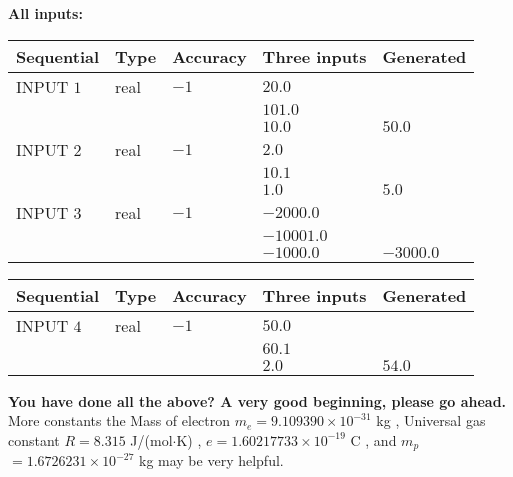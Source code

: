 \documentclass[12pt]{article}
\begin{document}
   
   
   
\noindent\vspace{0.1in}\hspace{-0.08in} {\textbf{\Large{All inputs: }}}
   
   
  
  
\noindent\begin{tabular}{|l|l|l|l|l|}
\hline
 Sequential & Type & Accuracy & Three inputs & Generated \\ 
\hline
 
 
  INPUT $           1$ & real & $          -1 $ & $
 20.0
  $ & \\
  & & &  $
 101.0
  $ & \\
  & & &  $
 10.0
 $ & $ 50.0 $ 
 \\  \hline  
 
 
  INPUT $           2$ & real & $          -1 $ & $
 2.0
  $ & \\
  & & &  $
 10.1
  $ & \\
  & & &  $
 1.0
 $ & $ 5.0 $ 
 \\  \hline  
 
 
  INPUT $           3$ & real & $          -1 $ & $
 -2000.0
  $ & \\
  & & &  $
 -10001.0
  $ & \\
  & & &  $
 -1000.0
 $ & $ -3000.0 $ 
 \\  \hline  
 \end{tabular}
   
   
  
  
\noindent\begin{tabular}{|l|l|l|l|l|}
\hline
 Sequential & Type & Accuracy & Three inputs & Generated \\ 
\hline
 
 
  INPUT $           4$ & real & $          -1 $ & $
 50.0
  $ & \\
  & & &  $
 60.1
  $ & \\
  & & &  $
 2.0
 $ & $ 54.0 $ 
 \\  \hline  
 \end{tabular}
   
   
   
   
\vspace{0.3in}
{\textbf{\LARGE{You have done all the above? A very good beginning, please go ahead.}}}
More constants the
Mass of electron
$m_e$$ =
9.109390 \times 10^{-31} $
kg
,
Universal gas constant
$R$$ =
8.315 $
J/(mol$\cdot $K)
,
$e$$ =
1.60217733 \times 10^{-19} $
C
, and
$m_p$$ =
1.6726231 \times 10^{-27} $
kg
%
may be very helpful.
\vspace{0.3in}
   
\end{document}
